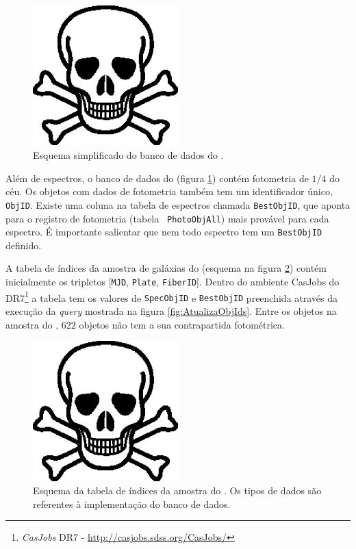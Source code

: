 \begin{figure}
	\includegraphics[width=0.5\textwidth]{figuras/test.eps}
	\caption[Esquema simplificado do banco de dados do \SDSS.]
	{Esquema simplificado do banco de dados do \SDSS.}
	\label{fig:EsquemaSDSS}
\end{figure}

Além de espectros, o banco de dados do \SDSS (figura \ref{fig:EsquemaSDSS})
contém fotometria de $1/4$ do céu. Os objetos com dados de fotometria também tem
um identificador único, {\tt ObjID}. Existe uma coluna na tabela de espectros
chamada {\tt BestObjID}, que aponta para o registro de fotometria (tabela {\tt
PhotoObjAll}) mais provável para cada espectro. É importante salientar que nem
todo espectro tem um {\tt BestObjID} definido.

A tabela de índices da amostra de galáxias do \starlight (esquema na figura
\ref{fig:TabelaAmostraStarlight}) contém inicialmente os tripletos [{\tt MJD},
{\tt Plate}, {\tt FiberID}]. Dentro do ambiente {CasJobs} do \SDSS
DR7\footnote{{\em CasJobs} \SDSS DR7 - \url{http://casjobs.sdss.org/CasJobs/}} a
tabela tem os valores de {\tt SpecObjID} e {\tt BestObjID} preenchida através da
execução da {\em query} mostrada na figura \ref{fig:AtualizaObjIds}. Entre os
objetos na amostra do \starlight, $622$ objetos não tem a sua contrapartida
fotométrica.

\begin{figure}
	\includegraphics[width=0.5\textwidth]{figuras/test.eps}
	\caption[Tabela de índices da amostra do \starlight.]
	{Esquema da tabela de índices da amostra do \starlight. Os tipos de dados são
	referentes à implementação do banco de dados.}
	\label{fig:TabelaAmostraStarlight}
\end{figure}


